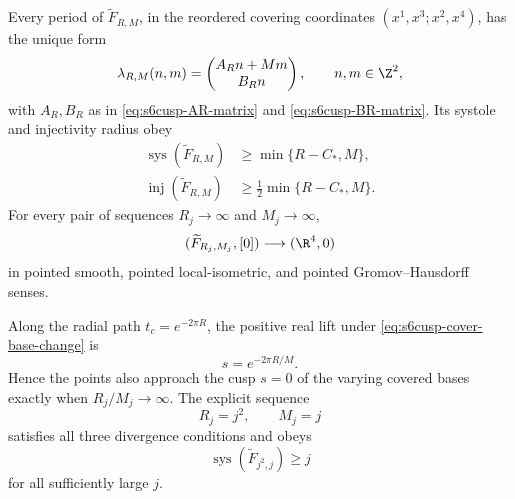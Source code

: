 \begin{theorem}
\label{thm:s6cusp-covered-R4-limit}
Every period of \(\widetilde F_{R,M}\), in the reordered covering
coordinates \((x^1,x^3;x^2,x^4)\), has the unique form
\begin{equation}\label{eq:s6cusp-covered-period-block-form}
 \lambda_{R,M}(n,m)=
 \begin{pmatrix}
 A_Rn+Mm\\
 B_Rn
 \end{pmatrix},
 \qquad n,m\in\Z^2,
\end{equation}
with \(A_R,B_R\) as in
\eqref{eq:s6cusp-AR-matrix} and
\eqref{eq:s6cusp-BR-matrix}.  Its systole and injectivity radius obey
\begin{align}
 \operatorname{sys}(\widetilde F_{R,M})
 &\ge\min\{R-C_*,M\},
 \label{eq:s6cusp-covered-systole-bound}\\
 \operatorname{inj}(\widetilde F_{R,M})
 &\ge\frac12\min\{R-C_*,M\}.
 \label{eq:s6cusp-covered-injectivity-bound}
\end{align}
For every pair of sequences \(R_j\to\infty\) and \(M_j\to\infty\),
\begin{equation}\label{eq:s6cusp-covered-pointed-limit}
 (\widetilde F_{R_j,M_j},[0])
 \longrightarrow(\R^4,0)
\end{equation}
in pointed smooth, pointed local-isometric, and pointed
Gromov--Hausdorff senses.

Along the radial path \(t_c=e^{-2\pi R}\), the positive real lift under
\eqref{eq:s6cusp-cover-base-change} is
\begin{equation}\label{eq:s6cusp-covered-base-radial-coordinate}
 s=e^{-2\pi R/M}.
\end{equation}
Hence the points also approach the cusp \(s=0\) of the varying covered
bases exactly when \(R_j/M_j\to\infty\).  The explicit sequence
\[
 R_j=j^2,\qquad M_j=j
\]
satisfies all three divergence conditions and obeys
\[
 \operatorname{sys}(\widetilde F_{j^2,j})
 \ge j
\]
for all sufficiently large \(j\).
\end{theorem}

